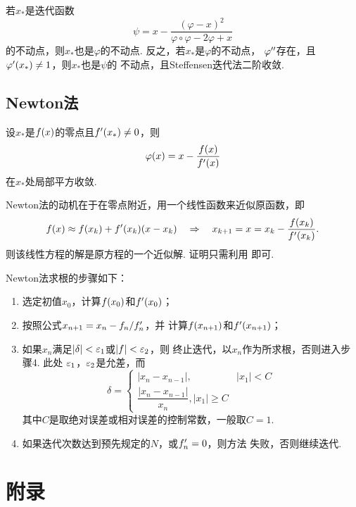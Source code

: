   \begin{thm}[Steffensen迭代法]
    若$x_*$是迭代函数
    \[
      \psi = x - \frac{(\varphi - x)^2}{\varphi\circ\varphi - 2\varphi + x}
    \]
    的不动点，则$x_*$也是$\varphi$的不动点. 反之，若$x_*$是$\varphi$的不动点，
    $\varphi^{\prime\prime}$存在，且$\varphi^\prime(x_*)\ne 1$，则$x_*$也是$\psi$的
    不动点，且Steffensen迭代法二阶收敛.
  \end{thm}

\subsection{Newton法}
  \begin{thm}[Newton法]
    设$x_*$是$\mathnormal{f}(x)$的零点且$\mathnormal{f}^\prime(x_*)\ne 0$，则
    \[
      \varphi(x) = x - \frac{\mathnormal{f}(x)}{\mathnormal{f}^\prime(x)}
    \]
    在$x_*$处局部平方收敛.
  \end{thm}
  \remark
    Newton法的动机在于在零点附近，用一个线性函数来近似原函数，即
    \[
      \mathnormal{f}(x) \approx \mathnormal{f}(x_k) + \mathnormal{f}^\prime(x_k)(x-x_k) \quad\Rightarrow\quad
      x_{k+1} = x = x_k - \frac{\mathnormal{f}(x_k)}{\mathnormal{f}^\prime(x_k)}.
    \]
    则该线性方程的解是原方程的一个近似解. 证明只需利用
    即可.

  \begin{alg}[Newton法]
    Newton法求根的步骤如下：
    \begin{enumerate}
      \item 选定初值$x_0$，计算$\mathnormal{f}(x_0)$和$\mathnormal{f}^\prime(x_0)$；
      \item 按照公式$x_{n+1} = x_n - \mathnormal{f}_n/\mathnormal{f}^\prime_n$，并
            计算$\mathnormal{f}(x_{n+1})$和$\mathnormal{f}^\prime(x_{n+1})$；
      \item 如果$x_n$满足$|\delta|<\varepsilon_1$或$|\mathnormal{f}|<\varepsilon_2$，则
        终止迭代，以$x_n$作为所求根，否则进入步骤4. 此处
        $\varepsilon_1$，$\varepsilon_2$是允差，而
        \[
          \delta =
          \begin{cases}
            |x_{n}-x_{n-1}|, & |x_1|<C \\
            \dfrac{|x_n-x_{n-1}|}{x_n}, |x_1|\ge C
          \end{cases}
        \]
        其中$C$是取绝对误差或相对误差的控制常数，一般取$C=1$.
      \item 如果迭代次数达到预先规定的$N$，或$\mathnormal{f}^\prime_n=0$，则方法
        失败，否则继续迭代.
    \end{enumerate}
  \end{alg}



\newpage
\section{附录}
